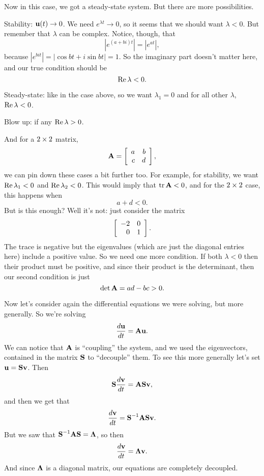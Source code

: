 Now in this case, we got a steady-state system. But there are more possibilities.
\ben
\item Stability: $\boldsymbol{\mathbf{u}}(t) \to 0$. We need $e^{\lambda t} \to 0$, so it seems that we should want $\lambda < 0$. But remember that $\lambda$ can be complex. Notice, though, that
\[ |e^{(a+bi)t}| = |e^{at}|, \]
because $|e^{bit}| = |\cos bt + i \sin bt| =1$. So the imaginary part doesn't matter here, and our true condition should be
\[ \mathrm{Re}\, \lambda < 0. \] 
\item Steady-state: like in the case above, so we want $\lambda_1 = 0$ and for all other $\lambda$, $\mathrm{Re}\, \lambda < 0$.
\item Blow up: if any $\mathrm{Re}\, \lambda > 0$.   
\een

And for a $2 \times 2$ matrix,
\[ \boldsymbol{\mathbf{A}} = \left[ \begin{array}{rrrrrrrrrrrrrrrrrrrrrrrrr} a&b\\c&d\\ \end{array} \right], \]
 we can pin down these cases a bit further too. For example, for stability, we want $\mathrm{Re}\, \lambda_1 < 0$ and $\mathrm{Re}\, \lambda_2 < 0$. This would imply that $\mathrm{tr}\, \boldsymbol{\mathbf{A}} < 0$, and for the $2 \times 2$ case, this happens when
\[ a + d < 0. \]
But is this enough? Well it's not: just consider the matrix
\[ \left[ \begin{array}{rrrrrrrrrrrrrrrrrrrrrrrrr} -2&0\\0&1\\ \end{array} \right]. \]
The trace is negative but the eigenvalues (which are just the diagonal entries here) include a positive value. So we need one more condition. If both $\lambda < 0$ then their product must be positive, and since their product is the determinant, then our second condition is just
\[ \mathrm{det}\, \boldsymbol{\mathbf{A}} = ad-bc > 0. \]

Now let's consider again the differential equations we were solving, but more generally. So we're solving
\[ \frac{d\boldsymbol{\mathbf{u}}}{dt} = \boldsymbol{\mathbf{A}} \boldsymbol{\mathbf{u}}. \]
We can notice that $\boldsymbol{\mathbf{A}}$ is ``coupling'' the system, and we used the eigenvectors, contained in the matrix $\boldsymbol{\mathbf{S}}$ to ``decouple'' them. To see this more generally let's set $\boldsymbol{\mathbf{u}} = \boldsymbol{\mathbf{S}}\boldsymbol{\mathbf{v}}$. Then
\[ \boldsymbol{\mathbf{S}}\frac{d\boldsymbol{\mathbf{v}}}{dt} = \boldsymbol{\mathbf{A}}\boldsymbol{\mathbf{S}}\boldsymbol{\mathbf{v}}, \]
and then we get that
\[ \frac{d\boldsymbol{\mathbf{v}}}{dt} = \boldsymbol{\mathbf{S}}^{-1} \boldsymbol{\mathbf{A}} \boldsymbol{\mathbf{S}} \boldsymbol{\mathbf{v}}. \]
But we saw that $\boldsymbol{\mathbf{S}}^{-1} \boldsymbol{\mathbf{A}} \boldsymbol{\mathbf{S}} = \boldsymbol{\mathbf{\Lambda}}$, so then
\[ \frac{d\boldsymbol{\mathbf{v}}}{dt} = \boldsymbol{\mathbf{\Lambda}} \boldsymbol{\mathbf{v}}. \]
And since $\boldsymbol{\mathbf{\Lambda}}$ is a diagonal matrix, our equations are completely decoupled.

